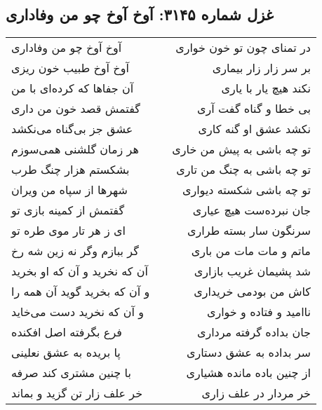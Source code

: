 \begin{center}
\section*{غزل شماره ۳۱۴۵: آوخ آوخ چو من وفاداری}
\label{sec:3145}
\begin{longtable}{l p{0.5cm} r}
آوخ آوخ چو من وفاداری
&&
در تمنای چون تو خون خواری
\\
آوخ آوخ طبیب خون ریزی
&&
بر سر زار زار بیماری
\\
آن جفاها که کرده‌ای با من
&&
نکند هیچ یار با یاری
\\
گفتمش قصد خون من داری
&&
بی خطا و گناه گفت آری
\\
عشق جز بی‌گناه می‌نکشد
&&
نکشد عشق او گنه کاری
\\
هر زمان گلشنی همی‌سوزم
&&
تو چه باشی به پیش من خاری
\\
بشکستم هزار چنگ طرب
&&
تو چه باشی به چنگ من تاری
\\
شهرها از سپاه من ویران
&&
تو چه باشی شکسته دیواری
\\
گفتمش از کمینه بازی تو
&&
جان نبرده‌ست هیچ عیاری
\\
ای ز هر تار موی طره تو
&&
سرنگون سار بسته طراری
\\
گر ببازم وگر نه زین شه رخ
&&
ماتم و مات مات من باری
\\
آن که نخرید و آن که او بخرید
&&
شد پشیمان غریب بازاری
\\
و آن که بخرید گوید آن همه را
&&
کاش من بودمی خریداری
\\
و آن که نخرید دست می‌خاید
&&
ناامید و فتاده و خواری
\\
فرع بگرفته اصل افکنده
&&
جان بداده گرفته مرداری
\\
پا بریده به عشق نعلینی
&&
سر بداده به عشق دستاری
\\
با چنین مشتری کند صرفه
&&
از چنین باده مانده هشیاری
\\
خر علف زار تن گزید و بماند
&&
خر مردار در علف زاری
\\
\end{longtable}
\end{center}
